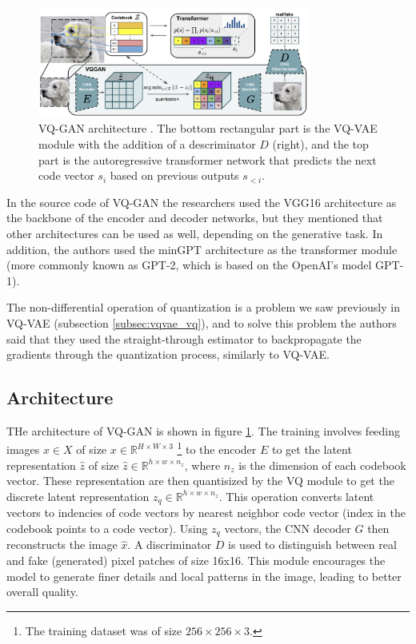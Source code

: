 \begin{figure}
    \centering
    \includegraphics[width=0.8\textwidth]{images/vqgan_architecture.png}
    \caption{VQ-GAN architecture \cite{vqgan}. The bottom rectangular part is the VQ-VAE module with the addition of a descriminator $D$ (right), and the top part is the autoregressive transformer network that predicts the next code vector $s_i$ based on previous outputs $s_{<i}$.}
    \label{fig:vqgan_architecture}
\end{figure}

In the source code of VQ-GAN the researchers used the VGG16 \cite{vgg16} architecture as the backbone of the encoder and decoder networks, but they mentioned that other architectures can be used as well, depending on the generative task. In addition, the authors used the minGPT \cite{mingpt} architecture as the transformer module (more commonly known as GPT-2, which is based on the OpenAI's model GPT-1).

The non-differential operation of quantization is a problem we saw previously in VQ-VAE (subsection \ref{subsec:vqvae_vq}), and to solve this problem the authors said that they used the straight-through estimator \cite{ste} to backpropagate the gradients through the quantization process, similarly to VQ-VAE.






\subsection{Architecture}

THe architecture of VQ-GAN is shown in figure \ref{fig:vqgan_architecture}. The training involves feeding images $x \in X$ of size $x \in \mathbb{R}^{H \times W \times 3}$ \footnote[2]{The training dataset was of size $256 \times 256 \times 3$.} to the encoder $E$ to get the latent representation $\hat{z}$ of size $\hat{z} \in \mathbb{R}^{h \times w \times n_z}$, where $n_z$ is the dimension of each codebook vector. These representation are then quantisized by the VQ module to get the discrete latent representation $z_q \in \mathbb{R}^{h \times w \times n_z}$. This operation converts latent vectors to indencies of code vectors by nearest neighbor code vector (index in the codebook points to a code vector). Using $z_q$ vectors, the CNN decoder $G$ then reconstructs the image $\hat{x}$. A discriminator $D$ is used to distinguish between real and fake (generated) pixel patches of size 16x16. This module encourages the model to generate finer details and local patterns in the image, leading to better overall quality.

